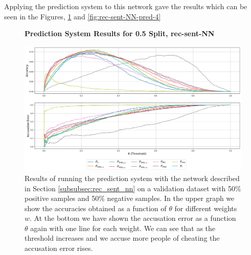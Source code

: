 Applying the prediction system to this network gave the results which
can be seen in the Figures, \ref{fig:rec-sent-NN-pred-50} and \ref{fig:rec-sent-NN-pred-4}

\begin{figure}
    \centering
    \textbf{Prediction System Results for 0.5 Split, \glsdesc{rec-sent-NN}}\par\medskip
    \includegraphics[scale=0.33]{./pictures/experiments/rec_sent_nn/prediction_system_50.png}
    \caption{Results of running the prediction system with the network described
        in Section \ref{subsubsec:rec_sent_nn} on a validation dataset
        with 50\% positive samples and 50\% negative samples. In the upper graph
        we show the accuracies obtained as a function of $\theta$ for different
        weights $w$. At the bottom we have shown the accusation error as a
        function $\theta$ again with one line for each weight. We can see that
        as the threshold increases and we accuse more people of cheating the
        accusation error rises.}
    \label{fig:rec-sent-NN-pred-50}
\end{figure}

